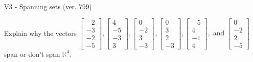 \begin{exercise}
  \begin{exerciseTitle}V3 - Spanning sets (ver. 799)\end{exerciseTitle}
  \begin{exerciseStatement}
    Explain why the vectors \(\left[\begin{array}{r}
-2 \\
-3 \\
-2 \\
-5
\end{array}\right] , \left[\begin{array}{r}
4 \\
-5 \\
-3 \\
3
\end{array}\right] , \left[\begin{array}{r}
0 \\
-2 \\
3 \\
-3
\end{array}\right] , \left[\begin{array}{r}
0 \\
3 \\
2 \\
-3
\end{array}\right] , \left[\begin{array}{r}
-5 \\
4 \\
-1 \\
4
\end{array}\right] , \text{ and } \left[\begin{array}{r}
0 \\
-2 \\
2 \\
-5
\end{array}\right]\) span or don't span \(\mathbb{R}^4\). 
	



\end{exerciseStatement}
\end{exercise}
